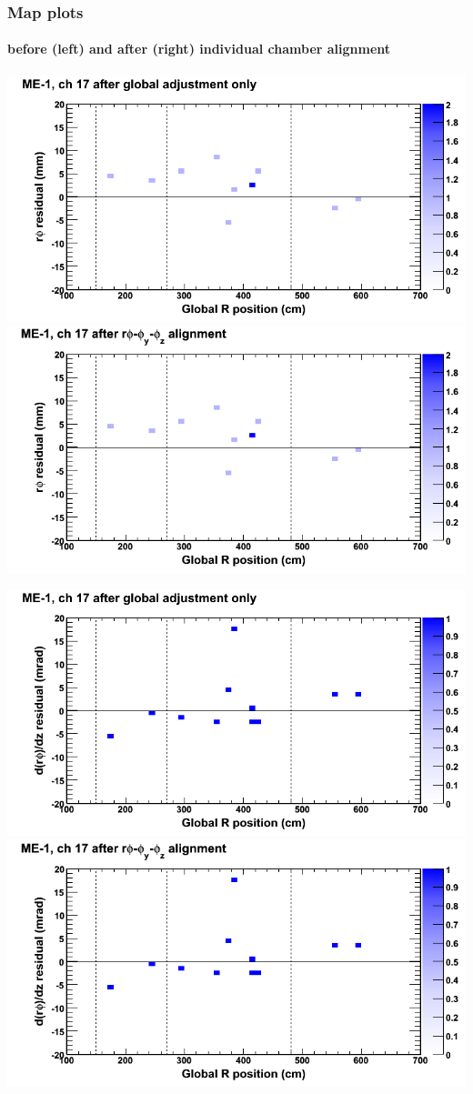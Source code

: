 \documentclass[compress]{beamer}
\begin{document}
\begin{frame}
\frametitle{Map plots}
\framesubtitle{before (left) and after (right) individual chamber alignment}
\includegraphics[width=0.5\linewidth]{ringmapplots_3dof/before_CSCvsr_mem1ch17_x.png} \includegraphics[width=0.5\linewidth]{ringmapplots_3dof/after_CSCvsr_mem1ch17_x.png}

\includegraphics[width=0.5\linewidth]{ringmapplots_3dof/before_CSCvsr_mem1ch17_dxdz.png} \includegraphics[width=0.5\linewidth]{ringmapplots_3dof/after_CSCvsr_mem1ch17_dxdz.png}
\end{frame}
\end{document}
